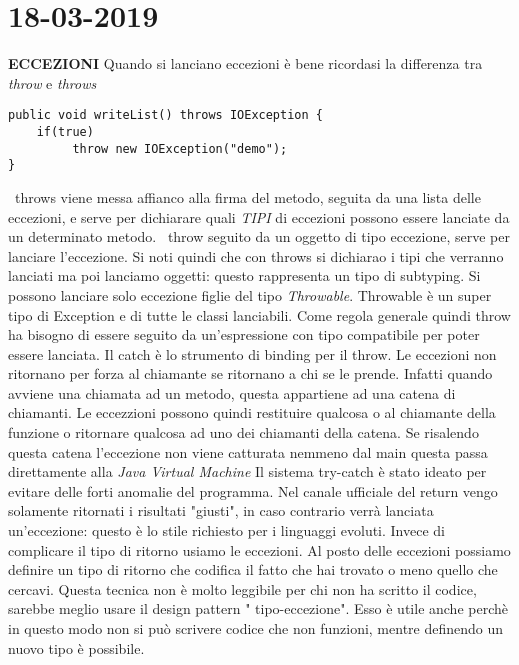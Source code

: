 

\newpage
\section{18-03-2019}
\textbf{ECCEZIONI} \newline
Quando si lanciano eccezioni è bene ricordasi la differenza tra \textit{throw} e \textit{throws}
\begin{lstlisting}[basicstyle=\small,]
public void writeList() throws IOException {
	if(true)
		 throw new IOException("demo"); 
}
\end{lstlisting}
\textbullet\ throws viene messa affianco alla firma del metodo, seguita da una lista delle eccezioni, e serve per dichiarare quali \textit{TIPI} di eccezioni possono essere lanciate da un determinato metodo. \newline
\textbullet\ throw seguito da un oggetto di tipo eccezione, serve per lanciare l'eccezione. \newline
Si noti quindi che con throws si dichiarao i tipi che verranno lanciati ma poi lanciamo oggetti: questo rappresenta un tipo di subtyping.
\newline
Si possono lanciare solo eccezione figlie del tipo \textit{Throwable}. Throwable è un super tipo di Exception e di tutte le classi lanciabili. \newline
Come regola generale quindi throw ha bisogno di essere seguito da un'espressione con tipo compatibile per poter essere lanciata.\newline
Il catch è lo strumento di binding per il throw. \newline
Le eccezioni non ritornano  per forza al chiamante se ritornano a chi se le prende. Infatti quando avviene una chiamata ad un metodo, questa appartiene ad una catena di chiamanti. Le eccezzioni possono quindi restituire qualcosa o al chiamante della funzione o ritornare qualcosa ad uno dei chiamanti della catena. Se risalendo questa catena l'eccezione non viene catturata nemmeno dal main questa passa direttamente alla \textit{Java Virtual Machine}\newline
Il sistema try-catch è stato ideato per evitare delle forti anomalie del programma. \newline
Nel canale ufficiale del return vengo solamente ritornati i risultati "giusti", in caso contrario verrà lanciata un'eccezione: questo è lo stile richiesto per i linguaggi evoluti. Invece di complicare il tipo di ritorno usiamo le eccezioni. \newline
Al posto delle eccezioni possiamo definire  un tipo di ritorno che codifica il fatto che hai trovato o meno quello che cercavi. Questa tecnica non è molto leggibile per chi non ha scritto il codice, sarebbe meglio usare il design pattern " tipo-eccezione". Esso è utile anche perchè in questo modo non si può scrivere codice che non funzioni, mentre definendo un nuovo tipo è possibile.

\newpage






